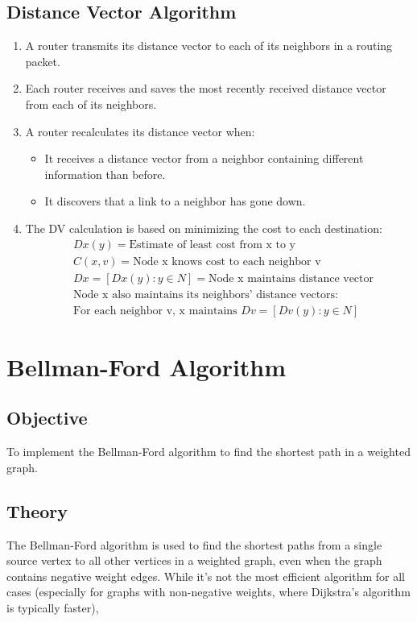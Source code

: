 \documentclass{korigamik}
\begin{document}
	\subsection{Distance Vector Algorithm}
	\begin{enumerate}
		\item A router transmits its distance vector to each of its neighbors in a
		      routing packet.
		\item Each router receives and saves the most recently received distance
		      vector from each of its neighbors.
		\item A router recalculates its distance vector when:
		      \begin{itemize}
			      \item It receives a distance vector from a neighbor containing
			            different information than before.
			      \item It discovers that a link to a neighbor has gone down.
		      \end{itemize}
		\item The DV calculation is based on minimizing the cost to each destination:
		      \begin{align*}
			       & Dx(y) = \text{Estimate of least cost from x to y}               \\
			       & C(x,v) = \text{Node x knows cost to each neighbor v}            \\
			       & Dx = [Dx(y): y \in N] = \text{Node x maintains distance vector} \\
			       & \text{Node x also maintains its neighbors' distance vectors:}   \\
			       & \text{For each neighbor v, x maintains } Dv = [Dv(y): y \in N]
		      \end{align*}
	\end{enumerate}
	\pagebreak
\fi


\section{Bellman-Ford Algorithm}
\label{sec:Bellman-Ford Algorithm}

\subsection{Objective}
To implement the Bellman-Ford algorithm to find the shortest path
in a weighted graph.

\subsection{Theory}
The Bellman-Ford algorithm is used to find the shortest paths from a
single source vertex to all other vertices in a weighted graph, even when the
graph contains negative weight edges. While it's not the most efficient
algorithm for all cases (especially for graphs with non-negative weights, where
Dijkstra's algorithm is typically faster),
\end{document}
